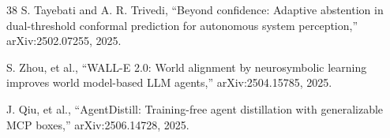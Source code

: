 \documentclass[11pt,a4paper]{article}
\begin{document}
\begin{thebibliography}{38}
 S. Tayebati and A. R. Trivedi, ``Beyond confidence: Adaptive
abstention in dual-threshold conformal prediction for autonomous system
perception,'' arXiv:2502.07255, 2025.

 S. Zhou, et al., ``WALL-E 2.0: World alignment by neurosymbolic
learning improves world model-based LLM agents,'' arXiv:2504.15785, 2025.

 J. Qiu, et al., ``AgentDistill: Training-free agent distillation
with generalizable MCP boxes,'' arXiv:2506.14728, 2025.

\end{thebibliography}
\end{document}
